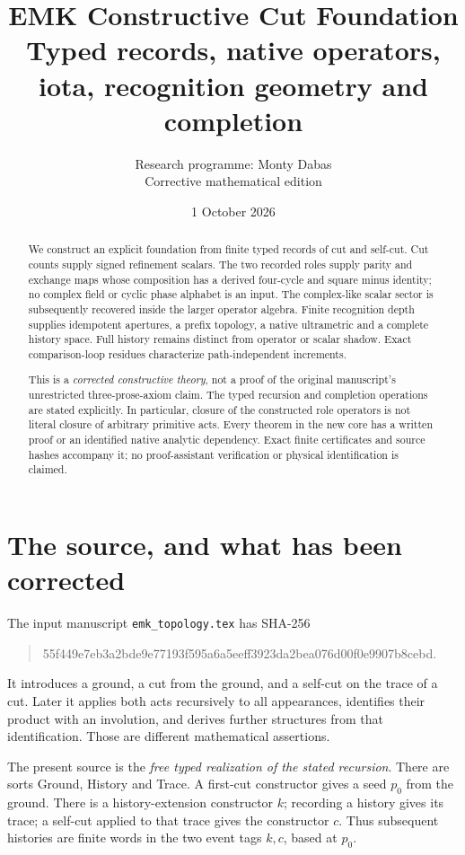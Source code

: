 \documentclass[11pt]{article}
\title{EMK Constructive Cut Foundation\\
\large Typed records, native operators, iota, recognition geometry and completion}
\author{Research programme: Monty Dabas\\\small Corrective mathematical edition}
\date{1 October 2026}
\begin{document}
\maketitle
\begin{abstract}
We construct an explicit foundation from finite typed records of cut and
self-cut. Cut counts supply signed refinement scalars. The two recorded roles
supply parity and exchange maps whose composition has a derived four-cycle and
square minus identity; no complex field or cyclic phase alphabet is an input.
The complex-like scalar sector is subsequently recovered inside the larger
operator algebra. Finite recognition depth supplies idempotent apertures,
a prefix topology, a native ultrametric and a complete history space. Full
history remains distinct from operator or scalar shadow. Exact comparison-loop
residues characterize path-independent increments.

This is a \emph{corrected constructive theory}, not a proof of the original
manuscript's unrestricted three-prose-axiom claim. The typed recursion and
completion operations are stated explicitly. In particular, closure of the
constructed role operators is not literal closure of arbitrary primitive acts.
Every theorem in the new core has a written proof or an identified native
analytic dependency. Exact finite certificates and source hashes accompany it;
no proof-assistant verification or physical identification is claimed.
\end{abstract}
\bigskip

\section{The source, and what has been corrected}
\label{sec:source}
The input manuscript \texttt{emk\_topology.tex} has SHA-256
\begin{quote}\ttfamily\small
55f449e7eb3a2bde9e77193f595a6a5eeff3923da2bea076d00f0e9907b8cebd.
\end{quote}
It introduces a ground, a cut from the ground, and a self-cut on the trace of
a cut. Later it applies both acts recursively to all appearances, identifies
their product with an involution, and derives further structures from that
identification. Those are different mathematical assertions.

The present source is the \emph{free typed realization of the stated recursion}.
There are sorts Ground, History and Trace. A first-cut constructor gives a
seed $p_0$ from the ground. There is a history-extension constructor $k$;
recording a history gives its trace; a self-cut applied to that trace gives
the constructor $c$. Thus subsequent histories are finite words in the two
event tags $k,c$, based at $p_0$.
\end{document}
